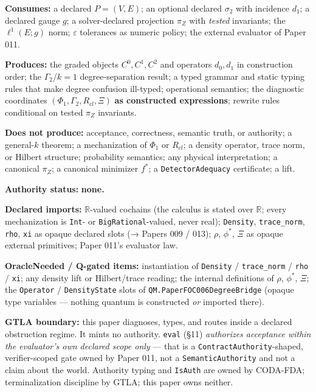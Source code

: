 \documentclass[
]{article}
\begin{document}
\textbf{Consumes:} a declared \(P=(V,E)\); an optional declared \(\sigma_2\) with incidence \(d_1\); a declared gauge \(g\); a solver-declared projection \(\pi_Z\) with \emph{tested} invariants; the \(\ell^1(E;g)\) norm; \(\varepsilon\) tolerances as numeric policy; the external evaluator of Paper 011.

\textbf{Produces:} the graded objects \(C^0,C^1,C^2\) and operators \(d_0,d_1\) in construction order; the \(\Gamma_2\)/\(k{=}1\) degree-separation result; a typed grammar and static typing rules that make degree confusion ill-typed; operational semantics; the diagnostic coordinates \((\Phi_1,\Gamma_2,R_{cl},\Xi)\) \textbf{as constructed expressions}; rewrite rules conditional on tested \(\pi_Z\) invariants.

\textbf{Does not produce:} acceptance, correctness, semantic truth, or authority; a general-\(k\) theorem; a mechanization of \(\Phi_1\) or \(R_{cl}\); a density operator, trace norm, or Hilbert structure; probability semantics; any physical interpretation; a canonical \(\pi_Z\); a canonical minimizer \(f^*\); a \texttt{DetectorAdequacy} certificate; a lift.

\textbf{Authority status:} \textbf{none.}

\textbf{Declared imports:} \(\mathbb{R}\)-valued cochains (the calculus is stated over \(\mathbb{R}\); every mechanization is \texttt{Int}- or \texttt{BigRational}-valued, never real); \texttt{Density}, \texttt{trace\_norm}, \texttt{rho}, \texttt{xi} as opaque declared slots (→ Papers 009 / 013); \(\rho\), \(\phi^*\), \(\Xi\) as opaque external primitives; Paper 011's evaluator law.

\textbf{OracleNeeded / Q-gated items:} instantiation of \texttt{Density} / \texttt{trace\_norm} / \texttt{rho} / \texttt{xi}; any density lift or Hilbert/trace reading; the internal definitions of \(\rho\), \(\phi^*\), \(\Xi\); the \texttt{Operator} / \texttt{DensityState} slots of \texttt{QM.PaperFOC006DegreeBridge} (opaque type variables --- nothing quantum is constructed \emph{or} imported there).

\textbf{GTLA boundary:} this paper diagnoses, types, and routes inside a declared obstruction regime. It mints no authority. \texttt{eval} (§11) \emph{authorizes acceptance within the evaluator's own declared scope only} --- that is a \texttt{ContractAuthority}-shaped, verifier-scoped gate owned by Paper 011, not a \texttt{SemanticAuthority} and not a claim about the world. Authority typing and \texttt{IsAuth} are owned by CODA-FDA; terminalization discipline by GTLA; this paper owns neither.
\end{document}
